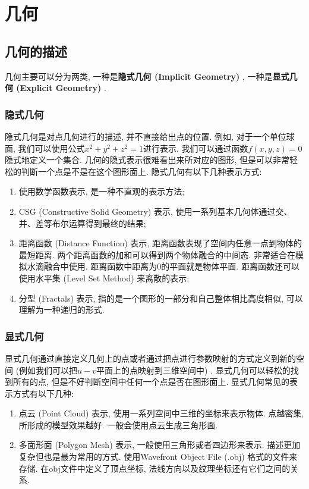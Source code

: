 \part{几何}
\chapter{几何的描述}

几何主要可以分为两类, 一种是\textbf{隐式几何 (Implicit Geometry) }, 一种是\textbf{显式几何 (Explicit Geometry) }. 

\section{隐式几何}
隐式几何是对点几何进行的描述, 并不直接给出点的位置. 例如, 对于一个单位球面, 我们可以使用公式$x^2+y^2+z^2=1$进行表示. 我们可以通过函数$f(x,y,z)=0$隐式地定义一个集合. 
几何的隐式表示很难看出来所对应的图形, 但是可以非常轻松的判断一个点是不是在这个图形面上. 隐式几何有以下几种表示方式: 
\begin{enumerate}
	\item 使用数学函数表示, 是一种不直观的表示方法; 
	\item CSG (Constructive Solid Geometry) 表示, 使用一系列基本几何体通过交、并、差等布尔运算得到最终的结果; 
	\item 距离函数 (Distance Function) 表示, 距离函数表现了空间内任意一点到物体的最短距离. 两个距离函数的加和可以得到两个物体融合的中间态. 非常适合在模拟水滴融合中使用. 距离函数中距离为0的平面就是物体平面. 距离函数还可以使用水平集 (Level Set Method) 来离散的表示; 
	\item 分型 (Fractals) 表示, 指的是一个图形的一部分和自己整体相比高度相似, 可以理解为一种递归的形式. 
\end{enumerate}

\vspace{\baselineskip}
\section{显式几何}
显式几何通过直接定义几何上的点或者通过把点进行参数映射的方式定义到新的空间 (例如我们可以把$u-v$平面上的点映射到三维空间中) . 显式几何可以轻松的找到所有的点, 但是不好判断空间中任何一个点是否在图形面上. 显式几何常见的表示方式有以下几种: 
\begin{enumerate}
	\item 点云 (Point Cloud) 表示, 使用一系列空间中三维的坐标来表示物体. 点越密集, 所形成的模型效果越好. 一般会使用点云生成三角形面. 
	\item 多面形面 (Polygon Mesh) 表示, 一般使用三角形或者四边形来表示. 描述更加复杂但也是最为常用的方式. 使用Wavefront Object File (.obj) 格式的文件来存储. 在obj文件中定义了顶点坐标, 法线方向以及纹理坐标还有它们之间的关系. 
\end{enumerate}

